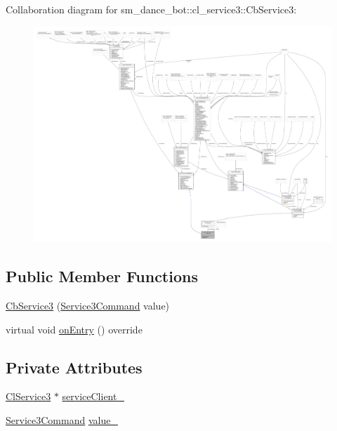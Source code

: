 Collaboration diagram for sm\+\_\+dance\+\_\+bot\+:\+:cl\+\_\+service3\+:\+:Cb\+Service3\+:
\nopagebreak
\begin{figure}[H]
\begin{center}
\leavevmode
\includegraphics[width=350pt]{classsm__dance__bot_1_1cl__service3_1_1CbService3__coll__graph}
\end{center}
\end{figure}
\subsection*{Public Member Functions}
\begin{DoxyCompactItemize}
\item 
\hyperlink{classsm__dance__bot_1_1cl__service3_1_1CbService3_a0f03200cabbf54e63efb0a6db4f48ebf}{Cb\+Service3} (\hyperlink{namespacesm__dance__bot_1_1cl__service3_adbcecb84d61edff09f1fb67ef9607ac4}{Service3\+Command} value)
\item 
virtual void \hyperlink{classsm__dance__bot_1_1cl__service3_1_1CbService3_ae9e3796b507ad96cc0890fec0f64a4b7}{on\+Entry} () override
\end{DoxyCompactItemize}
\subsection*{Private Attributes}
\begin{DoxyCompactItemize}
\item 
\hyperlink{classsm__dance__bot_1_1cl__service3_1_1ClService3}{Cl\+Service3} $\ast$ \hyperlink{classsm__dance__bot_1_1cl__service3_1_1CbService3_aad53b5aa5eb595c5add3701cfe72079c}{service\+Client\+\_\+}
\item 
\hyperlink{namespacesm__dance__bot_1_1cl__service3_adbcecb84d61edff09f1fb67ef9607ac4}{Service3\+Command} \hyperlink{classsm__dance__bot_1_1cl__service3_1_1CbService3_a9df8640d9bc42607256ca76df60a5af0}{value\+\_\+}
\end{DoxyCompactItemize}


